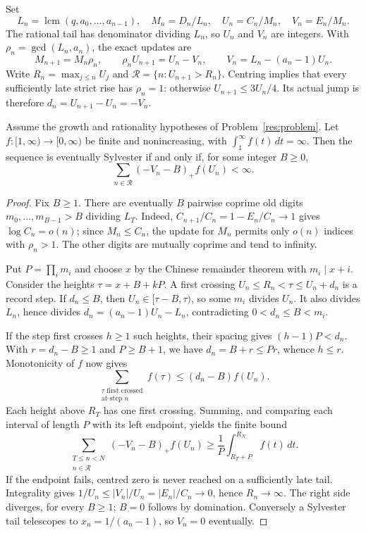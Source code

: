 \documentclass[11pt]{article}
\begin{document}
Set
\[
 L_n=\operatorname{lcm}(q,a_0,\ldots,a_{n-1}),\quad
 M_n=D_n/L_n,\quad U_n=C_n/M_n,\quad V_n=E_n/M_n.
\]
The rational tail has denominator dividing $L_n$, so $U_n$ and $V_n$ are
integers. With $\rho_n=\gcd(L_n,a_n)$, the exact updates are
\[
 M_{n+1}=M_n\rho_n,\qquad
 \rho_nU_{n+1}=U_n-V_n,\qquad V_n=L_n-(a_n-1)U_n.
\]
Write $R_n=\max_{j\le n}U_j$ and
$\mathcal R=\{n:U_{n+1}>R_n\}$. Centring implies that every sufficiently
late strict rise has $\rho_n=1$: otherwise $U_{n+1}\le3U_n/4$.
Its actual jump is therefore $d_n=U_{n+1}-U_n=-V_n$.

\begin{theorem}\label{res:weightedrecord}
Assume the growth and rationality hypotheses of Problem~\ref{res:problem}.
Let $f:[1,\infty)\to[0,\infty)$ be finite and nonincreasing, with
$\int_1^\infty f(t)\,dt=\infty$. Then the sequence is eventually Sylvester
if and only if, for some integer $B\ge0$,
\[
 \sum_{n\in\mathcal R}(-V_n-B)_+f(U_n)<\infty.
\]
\end{theorem}

\begin{proof}
Fix $B\ge1$. There are eventually $B$ pairwise coprime old digits
$m_0,\ldots,m_{B-1}>B$ dividing $L_T$. Indeed,
$C_{n+1}/C_n=1-E_n/C_n\to1$ gives $\log C_n=o(n)$; since
$M_n\le C_n$, the update for $M_n$ permits only $o(n)$ indices with
$\rho_n>1$. The other digits are mutually coprime and tend to infinity.

Put $P=\prod_i m_i$ and choose $x$ by the Chinese remainder theorem with
$m_i\mid x+i$. Consider the heights $\tau=x+B+kP$. A first crossing
$U_n\le R_n<\tau\le U_n+d_n$ is a record step. If $d_n\le B$, then
$U_n\in[\tau-B,\tau)$, so some $m_i$ divides $U_n$. It also divides
$L_n$, hence divides $d_n=(a_n-1)U_n-L_n$, contradicting
$0<d_n\le B<m_i$.

If the step first crosses $h\ge1$ such heights, their spacing gives
$(h-1)P<d_n$. With $r=d_n-B\ge1$ and $P\ge B+1$, we have
$d_n=B+r\le Pr$, whence $h\le r$. Monotonicity of $f$ now gives
\[
 \sum_{\substack{\tau\text{ first crossed}\\\text{at step }n}}f(\tau)
 \le(d_n-B)f(U_n).
\]
Each height above $R_T$ has one first crossing. Summing, and comparing each
interval of length $P$ with its left endpoint, yields the finite bound
\begin{equation}\label{eq:weightedcrossing}
 \sum_{\substack{T\le n<N\\n\in\mathcal R}}(-V_n-B)_+f(U_n)
 \ge\frac1P\int_{R_T+P}^{R_N} f(t)\,dt.
\end{equation}
If the endpoint fails, centred zero is never reached on a sufficiently late
tail. Integrality gives $1/U_n\le|V_n|/U_n=|E_n|/C_n\to0$, hence
$R_n\to\infty$. The right side diverges, for every $B\ge1$; $B=0$ follows
by domination. Conversely a Sylvester tail telescopes to
$x_n=1/(a_n-1)$, so $V_n=0$ eventually.
\end{proof}
\end{document}
